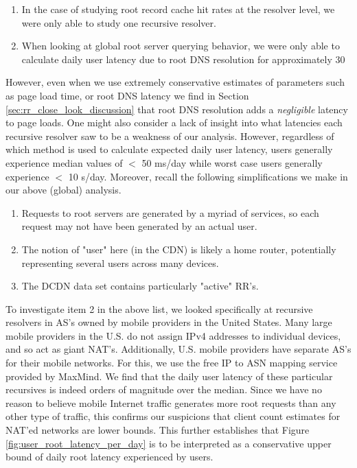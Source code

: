 \documentclass[sigconf,nonacm,10pt]{acmart}
\begin{document}
\begin{enumerate}
        \item In the case of studying root record cache hit rates at the resolver level, we were only able to study one recursive resolver.
        \item When looking at global root server querying behavior, we were only able to calculate daily user latency due to root DNS resolution for approximately 30%
\end{enumerate}

However, even when we use extremely conservative estimates of parameters
such as page load time, or root DNS latency we find in Section
\ref{sec:rr_close_look_discussion} that root DNS resolution adds a
\textit{negligible} latency to page loads. \break
One might also consider a lack of insight into what latencies each
recursive resolver saw to be a weakness of our analysis. However,
regardless of which method is used to calculate expected daily user
latency, users generally experience median values of \(<\) 50 ms/day
while worst case users generally experience \(<\) 10 s/day. Moreover,
recall the following simplifications we make in our above (global)
analysis.

\begin{enumerate}
        \item Requests to root servers are generated by a myriad of services, so each request may not have been generated by an actual user.
        \item The notion of "user" here (in the CDN) is likely a home router, potentially representing several users across many devices.
        \item The DCDN data set contains particularly "active" RR's.
\end{enumerate}

To investigate item 2 in the above list, we looked specifically at
recursive resolvers in AS's owned by mobile providers in the United
States. Many large mobile providers in the U.S. do not assign IPv4
addresses to individual devices, and so act as giant NAT's.
Additionally, U.S. mobile providers have separate AS's for their mobile
networks. For this, we use the free IP to ASN mapping service provided
by MaxMind. We find that the daily user latency of these particular
recursives is indeed orders of magnitude over the median. Since we have
no reason to believe mobile Internet traffic generates more root
requests than any other type of traffic, this confirms our suspicions
that client count estimates for NAT'ed networks are lower bounds. \break
This further establishes that Figure \ref{fig:user_root_latency_per_day}
is to be interpreted as a conservative upper bound of daily root latency
experienced by users.
\end{document}
